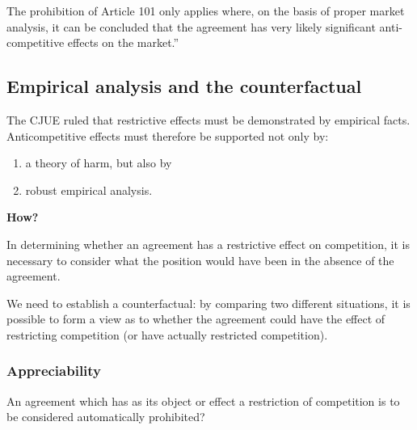         The prohibition of Article 101 only applies where, on the basis of proper market analysis, it can be concluded that the agreement has very likely significant anti-competitive effects on the market.”

    \subsection{Empirical analysis and the counterfactual}

        The CJUE ruled that restrictive effects must be demonstrated by empirical facts. Anticompetitive effects must therefore be supported not only by:
        \begin{enumerate}[label=\Roman*.]
            \item a theory of harm, but also by
            \item robust empirical analysis.
        \end{enumerate}
        
        \textbf{How?}
        
        In determining whether an agreement has a restrictive effect on competition, it is necessary to consider what the position would have been in the absence of the agreement.
        
        We need to establish a counterfactual: by comparing two different situations, it is possible to form a view as to whether the agreement could have the effect of restricting competition (or have actually restricted competition).
        
        \subsubsection{Appreciability}

        An agreement which has as its object or effect a restriction of competition is to be considered automatically prohibited?

